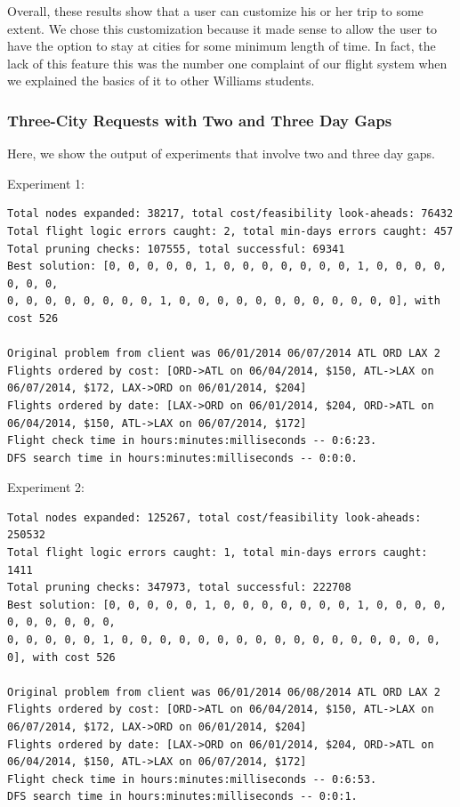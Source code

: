 \documentclass{article}
\begin{document}
Overall, these results show that a user can customize his or her trip to some extent. We chose this customization because it made sense to allow the
user to have the option to stay at cities for some minimum length of time. In fact, the lack of this feature this was the number one complaint of our
flight system when we explained the basics of it to other Williams students.

\subsubsection{Three-City Requests with Two and Three Day Gaps}

Here, we show the output of experiments that involve two and three day gaps.

Experiment 1:

\scriptsize
\begin{verbatim}
Total nodes expanded: 38217, total cost/feasibility look-aheads: 76432
Total flight logic errors caught: 2, total min-days errors caught: 457
Total pruning checks: 107555, total successful: 69341
Best solution: [0, 0, 0, 0, 0, 1, 0, 0, 0, 0, 0, 0, 0, 1, 0, 0, 0, 0, 0, 0, 0,
0, 0, 0, 0, 0, 0, 0, 0, 1, 0, 0, 0, 0, 0, 0, 0, 0, 0, 0, 0, 0], with cost 526

Original problem from client was 06/01/2014 06/07/2014 ATL ORD LAX 2
Flights ordered by cost: [ORD->ATL on 06/04/2014, $150, ATL->LAX on 06/07/2014, $172, LAX->ORD on 06/01/2014, $204]
Flights ordered by date: [LAX->ORD on 06/01/2014, $204, ORD->ATL on 06/04/2014, $150, ATL->LAX on 06/07/2014, $172]
Flight check time in hours:minutes:milliseconds -- 0:6:23.
DFS search time in hours:minutes:milliseconds -- 0:0:0.
\end{verbatim}
\normalsize

Experiment 2:

\scriptsize
\begin{verbatim}
Total nodes expanded: 125267, total cost/feasibility look-aheads: 250532
Total flight logic errors caught: 1, total min-days errors caught: 1411
Total pruning checks: 347973, total successful: 222708
Best solution: [0, 0, 0, 0, 0, 1, 0, 0, 0, 0, 0, 0, 0, 1, 0, 0, 0, 0, 0, 0, 0, 0, 0, 0,
0, 0, 0, 0, 0, 1, 0, 0, 0, 0, 0, 0, 0, 0, 0, 0, 0, 0, 0, 0, 0, 0, 0, 0], with cost 526

Original problem from client was 06/01/2014 06/08/2014 ATL ORD LAX 2
Flights ordered by cost: [ORD->ATL on 06/04/2014, $150, ATL->LAX on 06/07/2014, $172, LAX->ORD on 06/01/2014, $204]
Flights ordered by date: [LAX->ORD on 06/01/2014, $204, ORD->ATL on 06/04/2014, $150, ATL->LAX on 06/07/2014, $172]
Flight check time in hours:minutes:milliseconds -- 0:6:53.
DFS search time in hours:minutes:milliseconds -- 0:0:1.
\end{verbatim}
\normalsize
\end{document}
